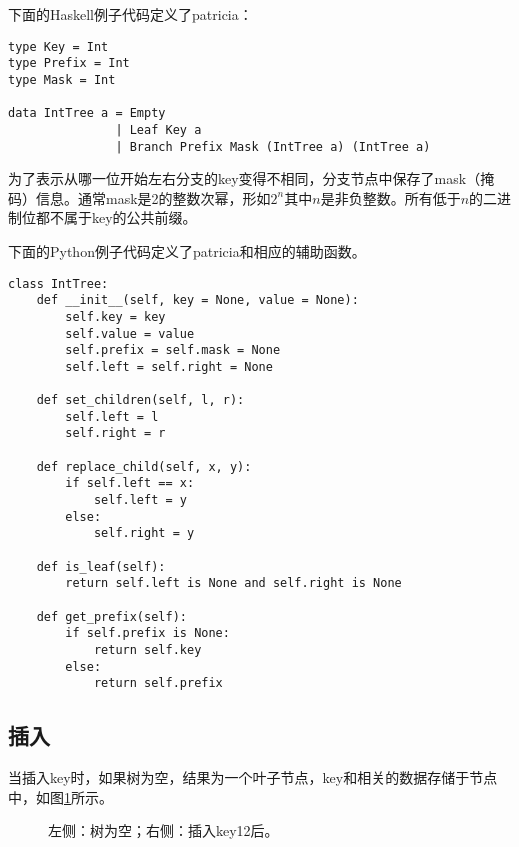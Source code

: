 \documentclass[UTF8]{article}
\begin{document}
下面的Haskell例子代码定义了patricia：

\lstset{language=Haskell}
\begin{lstlisting}
type Key = Int
type Prefix = Int
type Mask = Int

data IntTree a = Empty
               | Leaf Key a
               | Branch Prefix Mask (IntTree a) (IntTree a)
\end{lstlisting}

为了表示从哪一位开始左右分支的key变得不相同，分支节点中保存了mask（掩码）信息。通常mask是2的整数次幂，形如$2^n$其中$n$是非负整数。所有低于$n$的二进制位都不属于key的公共前缀。

下面的Python例子代码定义了patricia和相应的辅助函数。

\lstset{language=Python}
\begin{lstlisting}
class IntTree:
    def __init__(self, key = None, value = None):
        self.key = key
        self.value = value
        self.prefix = self.mask = None
        self.left = self.right = None

    def set_children(self, l, r):
        self.left = l
        self.right = r

    def replace_child(self, x, y):
        if self.left == x:
            self.left = y
        else:
            self.right = y

    def is_leaf(self):
        return self.left is None and self.right is None

    def get_prefix(self):
        if self.prefix is None:
            return self.key
        else:
            return self.prefix
\end{lstlisting}


\subsection{插入}
当插入key时，如果树为空，结果为一个叶子节点，key和相关的数据存储于节点中，如图\ref{fig:int-patricia-insert-a}所示。

\begin{figure}[htbp]
  \centering
  \caption{左侧：树为空；右侧：插入key12后。}
  \label{fig:int-patricia-insert-a}
\end{figure}
\end{document}
